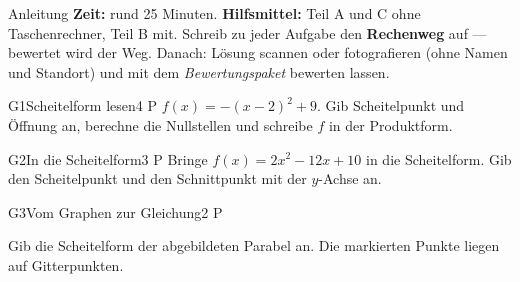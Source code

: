 \documentclass[11pt]{article}
\begin{document}

\begin{lpinfo}{Anleitung}
\textbf{Zeit:} rund 25 Minuten. \textbf{Hilfsmittel:} Teil A und C ohne Taschenrechner, Teil B mit.
Schreib zu jeder Aufgabe den \textbf{Rechenweg} auf — bewertet wird der Weg.
Danach: Lösung scannen oder fotografieren (ohne Namen und Standort) und mit dem \emph{Bewertungspaket} bewerten lassen.
\end{lpinfo}


\begin{lpaufgabe}{G1}{Scheitelform lesen}{4 P}
$f(x) = -(x-2)^2 + 9$. Gib Scheitelpunkt und Öffnung an, berechne die Nullstellen und schreibe $f$ in der Produktform.
\end{lpaufgabe}

\begin{lpaufgabe}{G2}{In die Scheitelform}{3 P}
Bringe $f(x) = 2x^2 - 12x + 10$ in die Scheitelform. Gib den Scheitelpunkt und den Schnittpunkt mit der $y$-Achse an.
\end{lpaufgabe}

\begin{lpaufgabe}{G3}{Vom Graphen zur Gleichung}{2 P}
\begin{minipage}[t]{0.52\linewidth}
Gib die Scheitelform der abgebildeten Parabel an. Die markierten Punkte liegen auf Gitterpunkten.
\end{minipage}\hfill
\begin{minipage}[t]{0.42\linewidth}\vspace{0pt}\centering
{}
\end{minipage}
\end{lpaufgabe}
\end{document}
